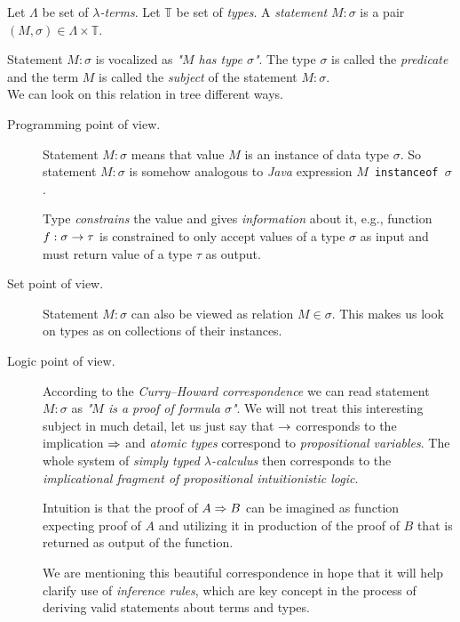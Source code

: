 \documentclass[12pt,a4paper]{report}
\newcommand{\lets}{let us\xspace}
\newcommand{\lterms}{$\lambda$-terms\xspace}
\begin{document}
\begin{definition}
	Let $\Lambda$ be set of {\it \lterms}. 
	Let $\mathbb{T}$ be set of {\it types}.       
	A {\it statement} $M : \sigma$ is a pair 
	$(M,\sigma) \in \Lambda \times \mathbb{T}$.
	\\ 
\end{definition}
	
Statement $M : \sigma$ is vocalized as {\it "$M$ has type $\sigma$"}.
The type $\sigma$ is called the {\it predicate} and 
the term $M$ is called the {\it subject} of the statement $M : \sigma$. \\

We can look on this relation in tree different ways.

\begin{description}
  \item[Programming point of view.] 
   Statement $M : \sigma$ means that value $M$ is 
   an instance of data type
   $\sigma$. So statement $M : \sigma$ is
   somehow analogous to \textit{Java}
   expression \texttt{$M$ instanceof $\sigma$}.    
   
   Type \textit{constrains} the value 
   and gives \textit{information} about it, 
   e.g., function $f : \sigma \rightarrow \tau$ 
   is constrained to only accept values of a type $\sigma$
   as input and must return value of a type $\tau$ as output.
     
  \item[Set point of view.] 
     Statement $M : \sigma$ can also be viewed as relation
     $M \in \sigma$. This makes us look on types as on
     collections of their instances.
      
  \item[Logic point of view.] According to 
  the \textit{Curry–Howard correspondence}
  we can read statement $M : \sigma$ as 
  \textit{"$M$ is a proof of formula $\sigma$"}.
  We will not treat this interesting subject in much detail,
  \lets just say that $\rightarrow$ corresponds to the
  implication $\Rightarrow$ and \textit{atomic types} correspond to
  \textit{propositional variables}. The whole system of
  \textit{simply typed $\lambda$-calculus} then corresponds
  to the \textit{implicational fragment of propositional 
  intuitionistic logic}.
   
  Intuition is that the proof of $A \Rightarrow B$ 
  can be imagined as function expecting proof of $A$
  and utilizing it in production of the proof of $B$
  that is returned as output of the function. 
    
  We are mentioning this beautiful
  correspondence in hope that it will help clarify 
  use of \textit{inference rules}, which are key concept
  in the process of deriving valid statements about
  terms and types.  
      
\end{description}  	
	
\end{document}
